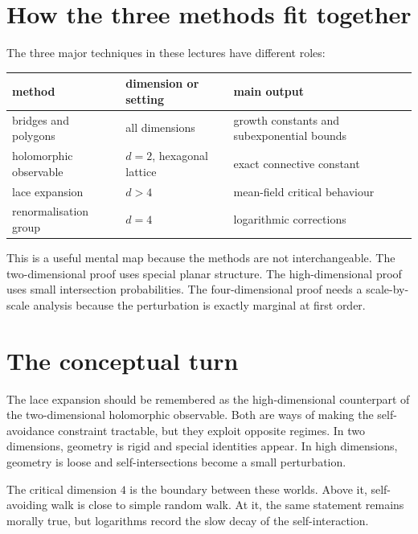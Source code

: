 \section{How the three methods fit together}

The three major techniques in these lectures have different roles:
\begin{center}
\small
\begin{tabular}{>{\raggedright\arraybackslash}p{}>{\raggedright\arraybackslash}p{}>{\raggedright\arraybackslash}p{}}
\toprule
method & dimension or setting & main output\\
\midrule
bridges and polygons & all dimensions & growth constants and subexponential bounds\\
holomorphic observable & \(d=2\), hexagonal lattice & exact connective constant\\
lace expansion & \(d>4\) & mean-field critical behaviour\\
renormalisation group & \(d=4\) & logarithmic corrections\\
\bottomrule
\end{tabular}
\end{center}
This is a useful mental map because the methods are not interchangeable.  The two-dimensional proof uses special planar structure.  The high-dimensional proof uses small intersection probabilities.  The four-dimensional proof needs a scale-by-scale analysis because the perturbation is exactly marginal at first order.

\section{The conceptual turn}

The lace expansion should be remembered as the high-dimensional counterpart of the two-dimensional holomorphic observable.  Both are ways of making the self-avoidance constraint tractable, but they exploit opposite regimes.  In two dimensions, geometry is rigid and special identities appear.  In high dimensions, geometry is loose and self-intersections become a small perturbation.

The critical dimension \(4\) is the boundary between these worlds.  Above it, self-avoiding walk is close to simple random walk.  At it, the same statement remains morally true, but logarithms record the slow decay of the self-interaction.
